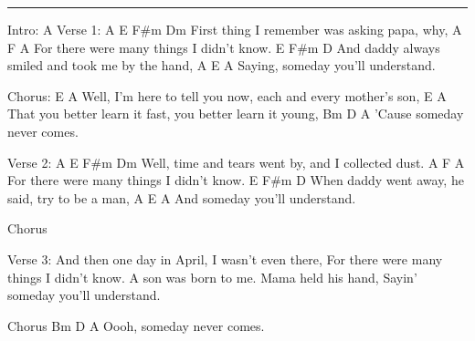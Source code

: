 \noindent\rule{\columnwidth}{1pt}
\begin{lstsong}
Intro: A
Verse 1:
A               E          F#m          Dm
First thing I remember was asking papa, why,
    A               F               A
For there were many things I didn't know.
                 E          F#m            D
And daddy always smiled and took me by the hand,
        A       E           A
Saying, someday you'll understand.

Chorus:
          E                              A
Well, I'm here to tell you now, each and every mother's son,
         E                         A
That you better learn it fast, you better learn it young,
       Bm    D       A
'Cause someday never comes.

Verse 2:
      A              E            F#m         Dm
Well, time and tears went by, and I collected dust.
    A               F               A
For there were many things I didn't know.
                 E             F#m         D
When daddy went away, he said, try to be a man,
    A       E           A
And someday you'll understand.

Chorus

Verse 3:
And then one day in April, I wasn't even there,
For there were many things I didn't know.
A son was born to me. Mama held his hand,
Sayin' someday you'll understand.

Chorus
      Bm      D     A
Oooh, someday never comes.
\end{lstsong}
\newpage

\begin{comment}
Chorus
      Bm      D     A     F (Key change)
Oooh, someday never comes.

Verse 4:
Bb              F           Gm           Ebm
Think it was September, the year I went away,
    Bb              Gb              Bb
For there were many things I didn't know.
                    F        Gm             Eb
And I still see him standing tryin' to be a man,
        Bb      F           Bb
I said, someday you'll understand.

Chorus
          F                              Bb
Well, I'm here to tell you now, each and every mother's son,
         F                         Bb
That you better learn it fast, you better learn it young,
       Cm      Eb*   Bb
'Cause someday never comes.
      Cm      Eb*   Bb
Oooh, someday never comes.

Outro: Cm  Eb Bb (6x)
\end{comment}

